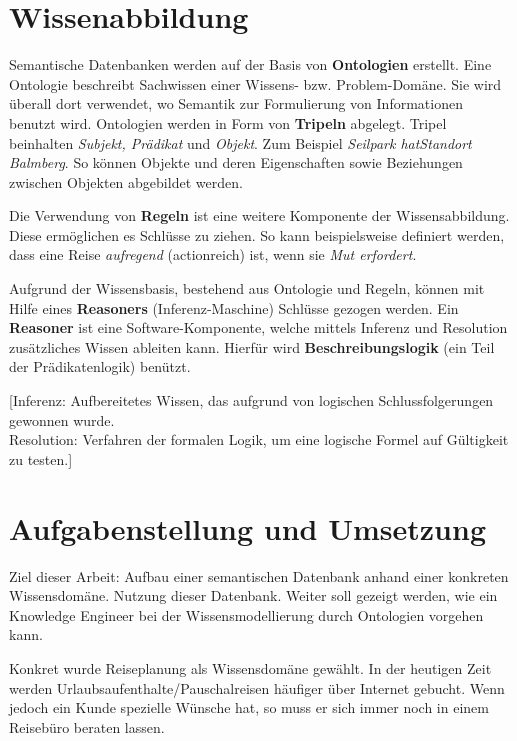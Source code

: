 \documentclass[
    paper=a4,               %
    fontsize=10pt,          %
    open=right,             %
    titlepage=false,        %
    parskip=half,           %
]{scrreprt}                 %
\begin{document}
    \begin{multicols}{3}
        \section*{Wissenabbildung}
        Semantische Datenbanken werden auf der Basis von \textbf{Ontologien} erstellt. Eine Ontologie beschreibt Sachwissen einer Wissens- bzw. Problem-Domäne. Sie wird überall dort verwendet, wo Semantik zur Formulierung von Informationen benutzt wird. Ontologien werden in Form von \textbf{Tripeln} abgelegt. Tripel beinhalten \textit{Subjekt, Prädikat} und \textit{Objekt}. Zum Beispiel \textit{Seilpark hatStandort Balmberg}. So können Objekte und deren Eigenschaften sowie Beziehungen zwischen Objekten abgebildet werden.

        Die Verwendung von \textbf{Regeln} ist eine weitere Komponente der Wissensabbildung. Diese ermöglichen es Schlüsse zu ziehen. So kann beispielsweise definiert werden, dass eine Reise \textit{aufregend} (actionreich) ist, wenn sie \textit{Mut erfordert}.

        Aufgrund der Wissensbasis, bestehend aus Ontologie und Regeln, können mit Hilfe eines \textbf{Reasoners} (Inferenz-Maschine) Schlüsse gezogen werden.
        Ein \textbf{Reasoner} ist eine Software-Komponente, welche mittels Inferenz und Resolution zusätzliches Wissen ableiten kann. Hierfür wird \textbf{Beschreibungslogik} (ein Teil der Prädikatenlogik) benützt.

        {[}Inferenz: Aufbereitetes Wissen, das aufgrund von logischen Schlussfolgerungen gewonnen wurde.\\
        Resolution: Verfahren der formalen Logik, um eine logische Formel auf Gültigkeit zu testen.{]}

        \section*{Aufgabenstellung und Umsetzung}
        Ziel dieser Arbeit:  Aufbau einer semantischen Datenbank anhand einer konkreten Wissensdomäne.  Nutzung dieser Datenbank. Weiter soll gezeigt werden, wie ein Knowledge Engineer bei der Wissensmodellierung durch Ontologien vorgehen kann.

        Konkret wurde Reiseplanung als Wissensdomäne gewählt. In der heutigen Zeit werden Urlaubsaufenthalte/Pauschalreisen häufiger über Internet gebucht. Wenn jedoch ein Kunde spezielle Wünsche hat, so muss er sich immer noch in einem Reisebüro beraten lassen. 


\end{multicols}
\end{document}
